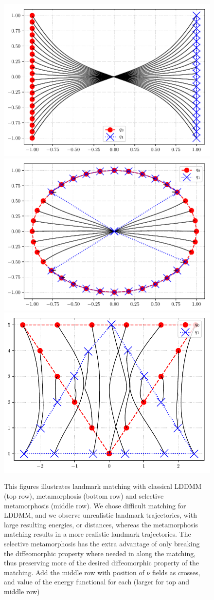 \documentclass[runningheads]{llncs}
\begin{document}
\begin{figure}
\begin{minipage}{\textwidth}
    \includegraphics[width=.3\textwidth]{mm_criss_cross.pdf}\quad
    \includegraphics[width=.3\textwidth]{mm_squeeze.pdf}\quad
    \includegraphics[width=.3\textwidth]{mm_triangle_flip.pdf}
    \caption{This figures illustrates landmark matching with classical LDDMM (top row), metamorphosis (bottom row) and selective metamorphosis (middle row). 
      We chose difficult matching for LDDMM, and we observe unrealistic landmark trajectories, with large resulting energies, or distances, whereas the metamorphosis  matching results in a more realistic landmark trajectories. 
      The selective metamorphosis has the extra advantage of only breaking the diffeomorphic property where needed in along the matching, thus preserving more of the desired diffeomorphic property of the matching. {\color{red} Add the middle row with position of $\nu$ fields as crosses, and value of the energy functional for each (larger for top and middle row)}}
    \label{fig:mm_lddmm}
\end{minipage}
\end{figure}

\end{document}
